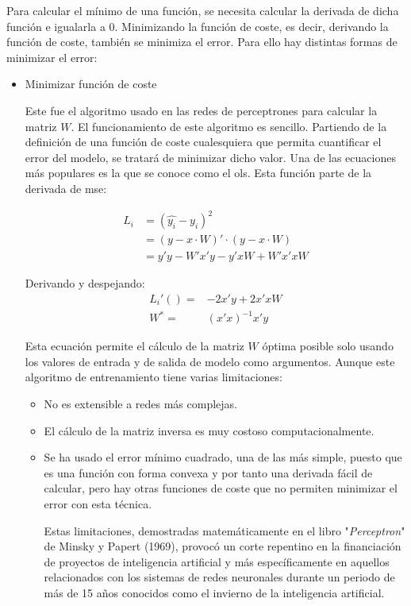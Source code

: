 Para calcular el mínimo de una función, se necesita calcular la derivada de dicha función e igualarla a $0$. Minimizando la función de coste, es decir, derivando la función de coste, también se minimiza el error. Para ello hay distintas formas de minimizar el error:
\begin{itemize}
\item Minimizar función de coste

Este fue el algoritmo usado en las redes de perceptrones para calcular la matriz $W$. El funcionamiento de este algoritmo es sencillo. Partiendo de la definición de una función de coste cualesquiera que permita cuantificar el error del modelo, se tratará de minimizar dicho valor. Una de las ecuaciones más populares es la que se conoce como el \acrlong{ols}. Esta función parte de la derivada de \acrshort{mse}:

\begin{equation}
    \begin{split}
    L_i & =  (\hat{y_i} - y_i)^2 \\
     & = (y - x \cdot W)' \cdot (y - x \cdot W) \\
     & = y'y - W'x'y - y'xW + W'x'x W
  \end{split}
\end{equation}

Derivando y despejando:
\begin{equation}
    \begin{split}
L_i'() = & -2x'y + 2x'xW \\
W^* = & (x'x)^{-1}x'y
\end{split}
\end{equation}

Esta ecuación permite el cálculo de la matriz $W$ óptima posible solo usando los valores de entrada y de salida de modelo como argumentos. Aunque este algoritmo de entrenamiento tiene varias limitaciones:
\begin{itemize}
\item No es extensible a redes más complejas.
\item El cálculo de la matriz inversa es muy costoso computacionalmente.
\item Se ha usado el error mínimo cuadrado, una de las más simple, puesto que es una función con forma convexa y por tanto una derivada fácil de calcular, pero hay otras funciones de coste que no permiten minimizar el error con esta técnica.
\newline

Estas limitaciones, demostradas matemáticamente en el libro "\textit{Perceptron}"\cite{papert} de Minsky y Papert (1969), provocó un corte repentino en la financiación de proyectos de inteligencia artificial y más específicamente en aquellos relacionados con los sistemas de redes neuronales durante un periodo de más de 15 años conocidos como el invierno de la inteligencia artificial.
\end{itemize}



\end{itemize}

